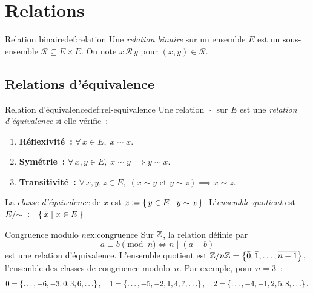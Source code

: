 \section{Relations}\label{sec:relations}

\begin{definition}{Relation binaire}{def:relation}
  Une \emph{relation binaire} sur un ensemble $E$
  est un sous-ensemble $\mathcal{R}\subseteq E\times E$. On note
  $x\,\mathcal{R}\,y$ pour $(x,y)\in\mathcal{R}$.
\end{definition}

\subsection{Relations d'équivalence}\label{subsec:equivalence}

\begin{definition}{Relation d'équivalence}{def:rel-equivalence}
  Une relation $\sim$ sur $E$ est une \emph{relation d'équivalence}%
   si elle vérifie~:
  \begin{enumerate}[label=(\roman*)]
    \item \textbf{Réflexivité~:} $\forall\, x\in E,\; x\sim x$.
    \item \textbf{Symétrie~:} $\forall\, x,y\in E,\; x\sim y\implies y\sim x$.
    \item \textbf{Transitivité~:} $\forall\, x,y,z\in E,\;
      (x\sim y\text{ et }y\sim z)\implies x\sim z$.
  \end{enumerate}
  La \emph{classe d'équivalence} de $x$ est
  $\bar{x}\coloneqq\left\{\,y\in E\;\middle|\;y\sim x\,\right\}$.
  L'\emph{ensemble quotient} est $E/{\sim}\;\coloneqq\left\{\,\bar{x}\;\middle|\;x\in E\,\right\}$.
\end{definition}

\begin{example}{Congruence modulo $n$}{ex:congruence}
  Sur ${\mathbb{Z}}$, la relation définie par
  \[
    a\equiv b\pmod{n} \iff n\mid(a-b)
  \]
  est une relation d'équivalence. L'ensemble quotient est
  ${\mathbb{Z}}/n{\mathbb{Z}} = \left\{\bar{0},\bar{1},\ldots,\overline{n-1}\right\}$, l'ensemble
  des classes de congruence modulo~$n$. Par exemple, pour $n=3$~:
  \[
    \bar{0}=\left\{\ldots,-6,-3,0,3,6,\ldots\right\},\quad
    \bar{1}=\left\{\ldots,-5,-2,1,4,7,\ldots\right\},\quad
    \bar{2}=\left\{\ldots,-4,-1,2,5,8,\ldots\right\}.
  \]
\end{example}

